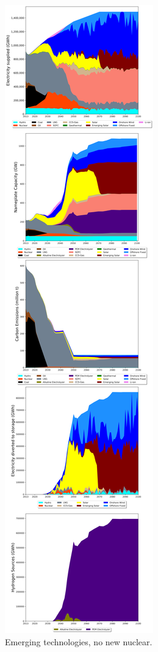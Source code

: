 \begin{figure}[h] 
\centering
\label{scen3}
\includegraphics[scale=0.2]{figures/newtechs_nonuc}
\caption{Emerging technologies, no new nuclear.}
\end{figure}

